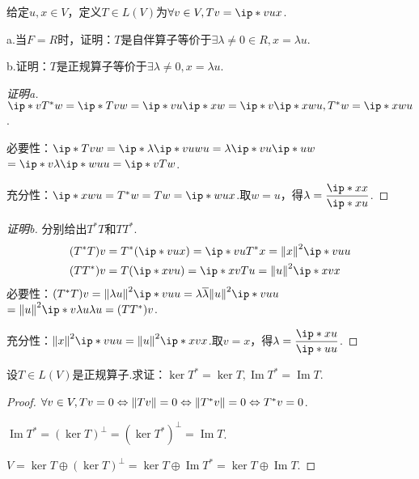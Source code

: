 \begin{problem}[15]\label{7.A.15}
    给定\(u,x \in V\)，定义\(T \in L(V)\)为\(\forall v \in V,Tv=\ip*{v}{u}x\).

    a.当\(F=R\)时，证明：\(T\)是自伴算子等价于\(\exists \lambda \ne 0 \in R,x=\lambda u\).
    
    b.证明：\(T\)是正规算子等价于\(\exists \lambda \ne 0,x=\lambda u\).
\end{problem}

\begin{proof}[证明a]
    \(\ip*{v}{T^*w}=\ip*{Tv}{w}=\ip*{v}{u}\ip*{x}{w}=\ip*{v}{\ip*{x}{w}u},T^*w=\ip*{x}{w}u\).

    必要性：\(\ip*{Tv}{w}=\ip*{\lambda \ip*{v}{u}}{w}u=\lambda \ip*{v}{u} \ip*{u}{w}\)
    \(=\ip*{v}{\lambda \ip*{w}{u}u}=\ip*{v}{Tw}\).
    
    充分性：\(\ip*{x}{w}u=T^*w=Tw=\ip*{w}{u}x\).取\(w=u\)，得\(\lambda=\dfrac{\ip*{x}{x}}{\ip*{x}{u}}\).
\end{proof}

\begin{proof}[证明b]
    分别给出\(T^*T\)和\(TT^*\).
    \begin{align*}
        &(T^*T)v=T^*(\ip*{v}{u}x)=\ip*{v}{u}T^*x=\norm*{x}^2\ip*{v}{u}u \\
        &(TT^*)v=T(\ip*{x}{v}u)=\ip*{x}{v}Tu=\norm*{u}^2\ip*{x}{v}x
    \end{align*}
    必要性：\((T^*T)v=\norm*{\lambda u}^2 \ip*{v}{u}u=\lambda \ol{\lambda} \norm*{u}^2 \ip*{v}{u}u\)
    \(=\norm*{u}^2 \ip*{v}{\lambda u}\lambda u=(TT^*)v\).

    充分性：\(\norm*{x}^2\ip*{v}{u}u=\norm*{u}^2\ip*{x}{v}x\).取\(v=x\)，得\(\lambda=\dfrac{\ip*{x}{u}}{\ip*{u}{u}}\).
\end{proof}

\begin{problem}[16]\label{7.A.16}
    设\(T \in L(V)\)是正规算子.求证：\(\ker T^*=\ker T,\operatorname{Im} T^*=\operatorname{Im} T\).
\end{problem}

\begin{proof}
    \(\forall v \in V,Tv=0 \Leftrightarrow \norm*{Tv}=0 \Leftrightarrow \norm*{T^*v}=0 \Leftrightarrow T^*v=0\).

    \(\operatorname{Im} T^*=(\ker T)^\bot=(\ker T^*)^\bot=\operatorname{Im} T\).

    \(V=\ker T \oplus (\ker T)^\bot=\ker T \oplus \operatorname{Im} T^*=\ker T \oplus \operatorname{Im} T\).
\end{proof}

